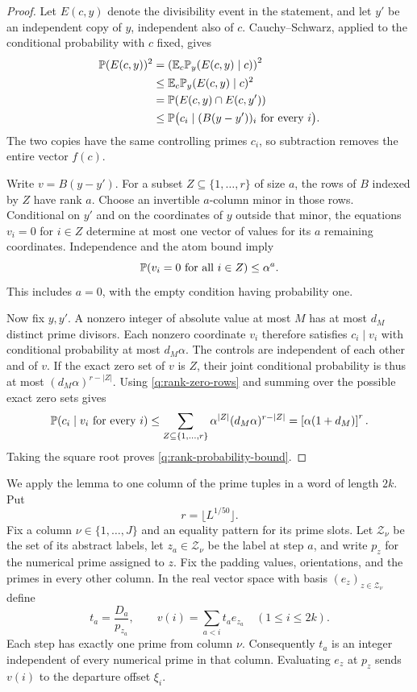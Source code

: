 \begin{proof}
Let $E(c,y)$ denote the divisibility event in the statement, and let
$y'$ be an independent copy of $y$, independent also of $c$.
Cauchy--Schwarz, applied to the conditional probability with $c$ fixed,
gives
\begin{align*}
 \mathbb P(E(c,y))^2
 &=\left(\mathbb E_c\mathbb P_y(E(c,y)\mid c)\right)^2\\
 &\le \mathbb E_c\mathbb P_y(E(c,y)\mid c)^2\\
 &=\mathbb P(E(c,y)\cap E(c,y'))\\
 &\le\mathbb P\bigl(c_i\mid (B(y-y'))_i\text{ for every }i\bigr).
\end{align*}
The two copies have the same controlling primes $c_i$, so subtraction
removes the entire vector $f(c)$.

Write $v=B(y-y')$.  For a subset $Z\subseteq\{1,\ldots,r\}$ of size
$a$, the rows of $B$ indexed by $Z$ have rank $a$.  Choose an
invertible $a$-column minor in those rows.  Conditional on $y'$ and on
the coordinates of $y$ outside that minor, the equations
$v_i=0$ for $i\in Z$ determine at most one vector of values for its
$a$ remaining coordinates.  Independence and the atom bound imply
\begin{equation}\label{q:rank-zero-rows}
 \mathbb P(v_i=0\text{ for all }i\in Z)\le\alpha^a.
\end{equation}
This includes $a=0$, with the empty condition having probability one.

Now fix $y,y'$.  A nonzero integer of absolute value at most $M$ has
at most $d_M$ distinct prime divisors.  Each nonzero coordinate $v_i$
therefore satisfies $c_i\mid v_i$ with conditional probability at most
$d_M\alpha$.  The controls are independent of each other and of $v$.
If the exact zero set of $v$ is $Z$, their joint conditional
probability is thus at most $(d_M\alpha)^{r-|Z|}$.
Using \eqref{q:rank-zero-rows} and summing over the possible exact zero
sets gives
\[
 \mathbb P(c_i\mid v_i\text{ for every }i)
 \le\sum_{Z\subseteq\{1,\ldots,r\}}
       \alpha^{|Z|}(d_M\alpha)^{r-|Z|}
 =\left[\alpha(1+d_M)\right]^r.
\]
Taking the square root proves \eqref{q:rank-probability-bound}.
\end{proof}

We apply the lemma to one column of the prime tuples in a word of
length $2k$.  Put
\[
 r=\lfloor L^{1/50}\rfloor.
\]
Fix a column $\nu\in\{1,\ldots,J\}$ and an equality pattern for its
prime slots.  Let $\mathcal Z_\nu$ be the set of its abstract labels,
let $z_a\in\mathcal Z_\nu$ be the label at step $a$, and write $p_z$
for the numerical prime assigned to $z$.  Fix the padding values,
orientations, and the primes in every other column.  In the real
vector space with basis $(e_z)_{z\in\mathcal Z_\nu}$ define
\begin{equation}\label{q:formal-offsets}
 t_a=\frac{D_a}{p_{z_a}},\qquad
 v(i)=\sum_{a<i}t_a e_{z_a}\quad(1\le i\le2k).
\end{equation}
Each step has exactly one prime from column $\nu$.  Consequently
$t_a$ is an integer independent of every numerical prime in that
column.  Evaluating $e_z$ at $p_z$ sends $v(i)$ to the departure
offset $\xi_i$.

